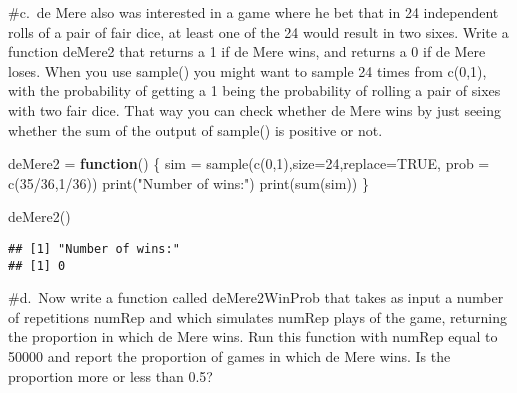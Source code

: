 \documentclass[
]{article}
\newenvironment{Shaded}{\begin{snugshade}}{\end{snugshade}}
\newcommand{\AttributeTok}[1]{\textcolor[rgb]{0.77,0.63,0.00}{#1}}
\newcommand{\ConstantTok}[1]{\textcolor[rgb]{0.00,0.00,0.00}{#1}}
\newcommand{\ControlFlowTok}[1]{\textcolor[rgb]{0.13,0.29,0.53}{\textbf{#1}}}
\newcommand{\DecValTok}[1]{\textcolor[rgb]{0.00,0.00,0.81}{#1}}
\newcommand{\FunctionTok}[1]{\textcolor[rgb]{0.00,0.00,0.00}{#1}}
\newcommand{\NormalTok}[1]{#1}
\newcommand{\OtherTok}[1]{\textcolor[rgb]{0.56,0.35,0.01}{#1}}
\newcommand{\SpecialCharTok}[1]{\textcolor[rgb]{0.00,0.00,0.00}{#1}}
\newcommand{\StringTok}[1]{\textcolor[rgb]{0.31,0.60,0.02}{#1}}
\begin{document}
\#c.~de Mere also was interested in a game where he bet that in 24
independent rolls of a pair of fair dice, at least one of the 24 would
result in two sixes. Write a function deMere2 that returns a 1 if de
Mere wins, and returns a 0 if de Mere loses. When you use sample() you
might want to sample 24 times from c(0,1), with the probability of
getting a 1 being the probability of rolling a pair of sixes with two
fair dice. That way you can check whether de Mere wins by just seeing
whether the sum of the output of sample() is positive or not.

\begin{Shaded}
\begin{Highlighting}[]
\NormalTok{deMere2 }\OtherTok{=} \ControlFlowTok{function}\NormalTok{()}
\NormalTok{\{}
\NormalTok{  sim }\OtherTok{=} \FunctionTok{sample}\NormalTok{(}\FunctionTok{c}\NormalTok{(}\DecValTok{0}\NormalTok{,}\DecValTok{1}\NormalTok{),}\AttributeTok{size=}\DecValTok{24}\NormalTok{,}\AttributeTok{replace=}\ConstantTok{TRUE}\NormalTok{, }\AttributeTok{prob =} \FunctionTok{c}\NormalTok{(}\DecValTok{35}\SpecialCharTok{/}\DecValTok{36}\NormalTok{,}\DecValTok{1}\SpecialCharTok{/}\DecValTok{36}\NormalTok{))}
  \FunctionTok{print}\NormalTok{(}\StringTok{"Number of wins:"}\NormalTok{)}
  \FunctionTok{print}\NormalTok{(}\FunctionTok{sum}\NormalTok{(sim))}
\NormalTok{\}}
\end{Highlighting}
\end{Shaded}

\begin{Shaded}
\begin{Highlighting}[]
\FunctionTok{deMere2}\NormalTok{()}
\end{Highlighting}
\end{Shaded}

\begin{verbatim}
## [1] "Number of wins:"
## [1] 0
\end{verbatim}

\#d.~Now write a function called deMere2WinProb that takes as input a
number of repetitions numRep and which simulates numRep plays of the
game, returning the proportion in which de Mere wins. Run this function
with numRep equal to 50000 and report the proportion of games in which
de Mere wins. Is the proportion more or less than 0.5?
\end{document}
